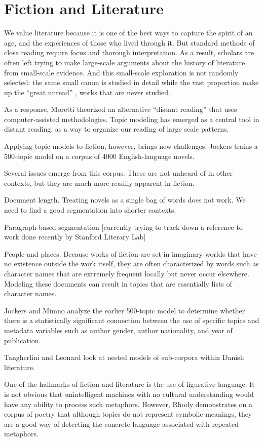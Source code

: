 
\chapter{Fiction and Literature}

\label{ch:fiction}

We value literature because it is one of the best ways to capture the spirit of an age, and the experiences of those who lived through it. But standard methods of close reading require focus and thorough interpretation. As a result, scholars are often left trying to make large-scale arguments about the history of literature from small-scale evidence. And this small-scale exploration is not randomly selected: the same small canon is studied in detail while the vast proportion make up the ``great unread'' \cite{moretti-00}, works that are never studied.

As a response, Moretti theorized an alternative ``distant reading''  \cite{moretti-13} that uses computer-assisted methodologies. Topic modeling has emerged as a central tool in distant reading, as a way to organize our reading of large scale patterns.

Applying topic models to fiction, however, brings new challenges. Jockers \cite{jockers-13} trains a 500-topic model on a corpus of 4000 English-language novels.

Several issues emerge from this corpus. These are not unheard of in other contexts, but they are much more readily apparent in fiction.

Document length. Treating novels as a single bag of words does not work. We need to find a good segmentation into shorter contexts.

Paragraph-based segmentation [currently trying to track down a reference to work done recently by Stanford Literary Lab]

People and places. Because works of fiction are set in imaginary worlds that have no existence outside the work itself, they are often characterized by words such as character names that are extremely frequent locally but never occur elsewhere. Modeling these documents can result in topics that are essentially lists of character names.

Jockers and Mimno \cite{jockers-13b} analyze the earlier 500-topic model to determine whether there is a statistically significant connection between the use of specific topics and metadata variables such as author gender, author nationality, and year of publication.

Tangherlini and Leonard \cite{tangherlini-13} look at nested models of sub-corpora within Danish literature.

One of the hallmarks of fiction and literature is the use of figurative language.
It is not obvious that unintelligent machines with no cultural understanding would have any ability to process such metaphors. However, Rhody \cite{rhody-12} demonstrates on a corpus of poetry that although topics do not represent symbolic meanings, they are a good way of detecting the concrete language associated with repeated metaphors.